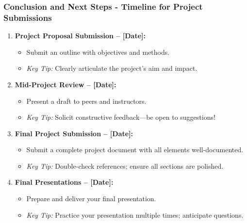 \documentclass[aspectratio=169]{beamer}
\begin{document}
\begin{frame}[fragile]
    \frametitle{Conclusion and Next Steps - Timeline for Project Submissions}
    \begin{enumerate}
        \item \textbf{Project Proposal Submission – [Date]:}
        \begin{itemize}
            \item Submit an outline with objectives and methods.
            \item \textit{Key Tip:} Clearly articulate the project's aim and impact.
        \end{itemize}
        
        \item \textbf{Mid-Project Review – [Date]:}
        \begin{itemize}
            \item Present a draft to peers and instructors.
            \item \textit{Key Tip:} Solicit constructive feedback—be open to suggestions!
        \end{itemize}
        
        \item \textbf{Final Project Submission – [Date]:}
        \begin{itemize}
            \item Submit a complete project document with all elements well-documented.
            \item \textit{Key Tip:} Double-check references; ensure all sections are polished.
        \end{itemize}
        
        \item \textbf{Final Presentations – [Date]:}
        \begin{itemize}
            \item Prepare and deliver your final presentation.
            \item \textit{Key Tip:} Practice your presentation multiple times; anticipate questions.
        \end{itemize}
    \end{enumerate}
\end{frame}
\end{document}
